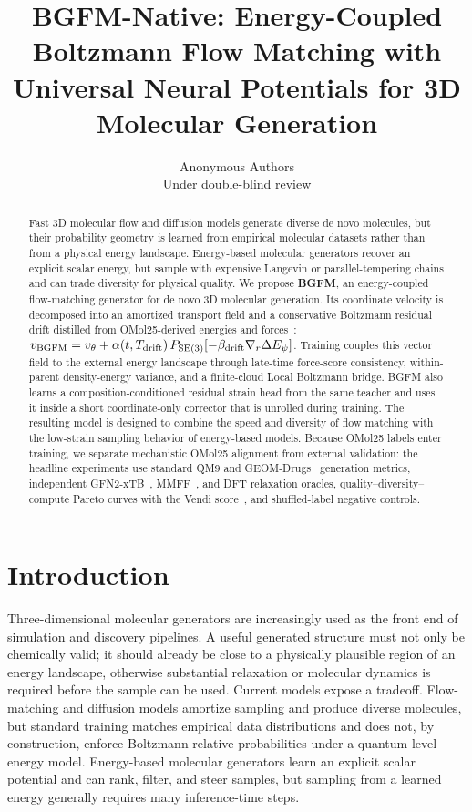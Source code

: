 \documentclass{article}
\title{BGFM-Native: Energy-Coupled Boltzmann Flow Matching with\\
Universal Neural Potentials for 3D Molecular Generation}
\author{Anonymous Authors\\
Under double-blind review}
\begin{document}
\maketitle

\begin{abstract}
Fast 3D molecular flow and diffusion models generate diverse de novo
molecules, but their probability geometry is learned from empirical
molecular datasets rather than from a physical energy landscape.
Energy-based molecular generators recover an explicit scalar energy,
but sample with expensive Langevin or parallel-tempering chains and can
trade diversity for physical quality. We propose \textbf{BGFM}, an energy-coupled flow-matching generator for
de novo 3D molecular generation.  Its coordinate velocity is decomposed
into an amortized transport field and a conservative Boltzmann residual
drift distilled from OMol25-derived energies and forces~\citep{omol25}:
$ v_{\rm BGFM}=v_\theta+\alpha(t,T_{\rm drift})\,P_{\rm SE(3)}[-\beta_{\rm drift}\nabla_r\Delta E_\psi] $.
Training couples this vector field to the external energy landscape
through late-time force-score consistency, within-parent density-energy
variance, and a finite-cloud Local Boltzmann bridge.  BGFM also learns a
composition-conditioned residual strain head from the same teacher and
uses it inside a short coordinate-only corrector that is unrolled during
training. The resulting model is designed to combine the speed and
diversity of flow matching with the low-strain sampling behavior of
energy-based models. Because OMol25 labels enter training, we separate
mechanistic OMol25 alignment from external validation: the headline
experiments use standard QM9 and GEOM-Drugs~\citep{geom} generation
metrics, independent
GFN2-xTB~\citep{gfn2xtb}, MMFF~\citep{mmff}, and DFT relaxation oracles,
quality--diversity--compute Pareto curves with the Vendi
score~\citep{friedman2023vendi}, and shuffled-label negative controls.
\end{abstract}

\section{Introduction}

Three-dimensional molecular generators are increasingly used as the
front end of simulation and discovery pipelines. A useful generated
structure must not only be chemically valid; it should already be close
to a physically plausible region of an energy landscape, otherwise
substantial relaxation or molecular dynamics is required before the
sample can be used. Current models expose a tradeoff. Flow-matching and
diffusion models amortize sampling and produce diverse molecules, but
standard training matches empirical data distributions and does not, by
construction, enforce Boltzmann relative probabilities under a
quantum-level energy model. Energy-based molecular generators learn an
explicit scalar potential and can rank, filter, and steer samples, but
sampling from a learned energy generally requires many inference-time
steps.
\end{document}
